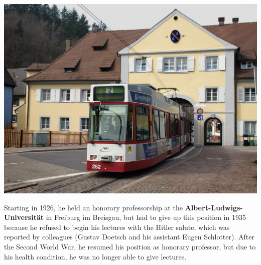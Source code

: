 \documentclass[landscape, a4paper]{article}
\newcommand\alert[1]{\textcolor{PrimaryColor}{\textbf{#1}}}
\begin{document}
\begin{minipage}[t]{0.31\textwidth}
	\includegraphics[width=\linewidth]{./figures/tor.png}
	\setlength{\parskip}{0.25cm}

  Starting in 1926, he held an honorary professorship at the \alert{Albert-Ludwigs-Universität} in Freiburg im Breisgau, but had to give up this position in 1935 because he refused to begin his lectures with the Hitler salute, which was reported by colleagues (Gustav Doetsch and his assistant Eugen Schlotter). After the Second World War, he resumed his position as honorary professor, but due to his health condition, he was no longer able to give lectures.

\end{minipage}%
\newpage
\end{document}
